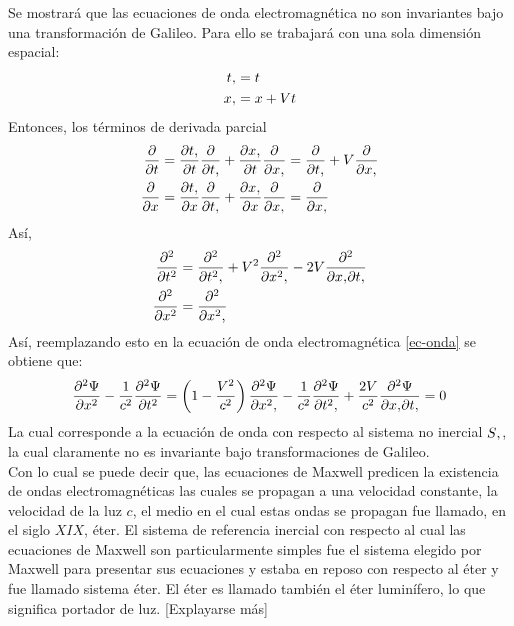 \documentclass[../main.tex]{subfiles}
\begin{document}
Se mostrará que las ecuaciones de onda electromagnética no son invariantes bajo una transformación de Galileo. Para ello se trabajará con una sola dimensión espacial:
\begin{equation}
    \begin{aligned}
        t\vtick & = t \\
        x \vtick & = x + Vt
    \end{aligned}
\end{equation}
Entonces, los términos de derivada parcial
\begin{align*}
    \frac{\partial}{\partial t} & =\frac{\partial t\vtick}{\partial t} \frac{\partial }{\partial t\vtick} + \frac{\partial x\vtick}{\partial t}\frac{\partial}{\partial x\vtick}=\frac{\partial}{\partial t\vtick} + V\frac{\partial}{\partial x\vtick} \\
    \frac{\partial}{\partial x} & = \frac{\partial t\vtick}{\partial x}\frac{\partial}{\partial t\vtick} + \frac{\partial x\vtick}{\partial x}\frac{\partial}{\partial x\vtick} = \frac{\partial}{\partial x\vtick}
\end{align*}
Así,
\begin{align*}
     \frac{\partial^2}{\partial t^2} & = \frac{\partial^2}{\partial t^2\vtick} + V^2\frac{\partial^2}{\partial x^2\vtick}-2V \frac{\partial^2}{\partial x\vtick \partial t\vtick} \\
     \frac{\partial^2}{\partial x^2} & = \frac{\partial^2}{\partial x^2\vtick}
\end{align*}
Así, reemplazando esto en la ecuación de onda electromagnética \eqref{ec-onda} se obtiene que:
\begin{equation}
    \frac{\partial^2\Psi}{\partial x^2} - \frac{1}{c^2}\frac{\partial^2\Psi}{\partial t^2} = \left( 1- \frac{V^2}{c^2}\right)\frac{\partial^2\Psi}{\partial x^2\vtick}  - \frac{1}{c^2}\frac{\partial^2\Psi}{\partial t^2\vtick} + \frac{2V}{c^2}\frac{\partial^2\Psi}{\partial x\vtick \partial t\vtick}=0
\end{equation}
La cual corresponde a la ecuación de onda con respecto al sistema no inercial $S\vtick$, la cual claramente no es invariante bajo transformaciones de Galileo. \\
Con lo cual se puede decir que, las ecuaciones de Maxwell predicen la existencia de ondas electromagnéticas las cuales se propagan a una velocidad constante, la velocidad de la luz $c$, el medio en el cual estas ondas se propagan fue llamado, en el siglo $XIX$, éter. El sistema de referencia inercial con respecto al cual las ecuaciones de Maxwell son particularmente simples fue el sistema elegido por Maxwell para presentar sus ecuaciones y estaba en reposo con respecto al éter y fue llamado sistema éter. El éter es llamado también el éter luminífero, lo que significa portador de luz.
[Explayarse más]
\end{document}
